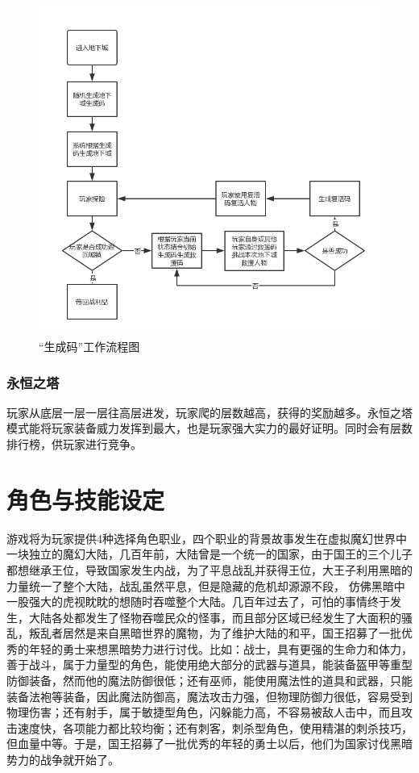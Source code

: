\documentclass[UTF8,AutoFakeBold=1,AutoFakeSlant,zihao=-4]{cucthesis}
\begin{document}
\begin{figure}[ht]
    \centering
    \includegraphics[scale=0.64]{imgs/生成码.png}    
    \caption{“生成码”工作流程图}
    \label{fig:code}
\end{figure}

\subsubsection{永恒之塔}
玩家从底层一层一层往高层进发，玩家爬的层数越高，获得的奖励越多。永恒之塔模式能将玩家装备威力发挥到最大，也是玩家强大实力的最好证明。同时会有层数排行榜，供玩家进行竞争。


\section{角色与技能设定}
游戏将为玩家提供4种选择角色职业，四个职业的背景故事发生在虚拟魔幻世界中一块独立的魔幻大陆，几百年前，大陆曾是一个统一的国家，由于国王的三个儿子都想继承王位，导致国家发生内战，为了平息战乱并获得王位，大王子利用黑暗的力量统一了整个大陆，战乱虽然平息，但是隐藏的危机却源源不段， 仿佛黑暗中一股强大的虎视眈眈的想随时吞噬整个大陆。几百年过去了，可怕的事情终于发生，大陆各处都发生了怪物吞噬民众的怪事，而且部分区域已经发生了大面积的骚乱，叛乱者居然是来自黑暗世界的魔物，为了维护大陆的和平，国王招募了一批优秀的年轻的勇士来想黑暗势力进行讨伐。比如：战士，具有更强的生命力和体力，善于战斗，属于力量型的角色，能使用绝大部分的武器与道具，能装备盔甲等重型防御装备，然而他的魔法防御很低；还有巫师，能使用魔法性的道具和武器，只能装备法袍等装备，因此魔法防御高，魔法攻击力强，但物理防御力很低，容易受到物理伤害；还有射手，属于敏捷型角色，闪躲能力高，不容易被敌人击中，而且攻击速度快，各项能力都比较均衡；还有刺客，刺杀型角色，使用精湛的刺杀技巧，但血量中等。于是，国王招募了一批优秀的年轻的勇士以后，他们为国家讨伐黑暗势力的战争就开始了。
\end{document}
